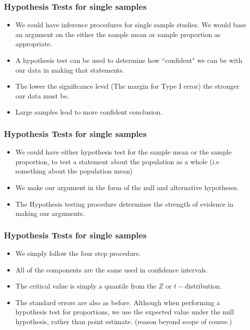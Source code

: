 ﻿\documentclass[a4]{beamer}
\begin{document}
\begin{frame}
\frametitle{Hypothesis Tests for single samples}

\begin{itemize}
\item We could have inference procedures for single sample studies. We would base an argument on the either the sample mean or sample proportion as appropriate.
\item A hypothesis test can be used to determine how ``confident" we can be with our data in making that statements.
\item The lower the significance level (The margin for Type I error) the stronger our data must be.
\item Large samples lead to more confident conclusion.
\end{itemize}
\end{frame}
\begin{frame}
\frametitle{Hypothesis Tests for single samples}
\begin{itemize}
\item We could have either hypothesis test for the sample mean or the sample proportion, to test a statement about the population as a whole (i.e something about the population mean)
\item We make our argument in the form of the null and alternative hypotheses. 
\item The Hypothesis testing procedure determines the strength of evidence in making our arguments. 
\end{itemize}
\end{frame}
\begin{frame}
\frametitle{Hypothesis Tests for single samples}
\begin{itemize}
\item We simply follow the four step procedure. 
\item All of the components are the same used in confidence intervals.
\item The critical value is simply a quantile from the $Z$ or $t-$distribution.
\item The standard errors are also as before. Although when performing a hypothesis test for proportions, we use the expected value under the null hypothesis, rather than point estimate. (reason beyond scope of course.)
\end{itemize}
\end{frame}

\end{document}

